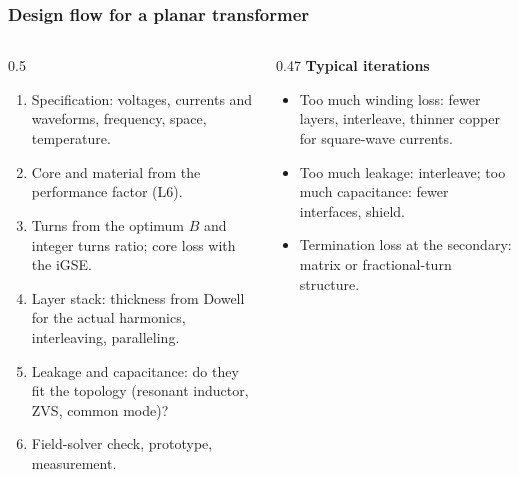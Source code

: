 \begin{frame}
	\frametitle{Design flow for a planar transformer}
	\begin{columns}[T]
		\begin{column}{0.5\textwidth}
			\small
			\begin{enumerate}
				\item Specification: voltages, currents and waveforms, frequency, space, temperature.
				\item Core and material from the performance factor (L6).
				\item Turns from the optimum $\hat{B}$ and integer turns ratio; core loss with the iGSE.
				\item Layer stack: thickness from Dowell for the actual harmonics, interleaving, paralleling.
				\item Leakage and capacitance: do they fit the topology (resonant inductor, ZVS, common mode)?
				\item Field-solver check, prototype, measurement.
			\end{enumerate}
		\end{column}
		\begin{column}{0.47\textwidth}
			\small
			\textbf{Typical iterations}
			\begin{itemize}
				\item Too much winding loss: fewer layers, interleave, thinner copper for square-wave currents.
				\item Too much leakage: interleave; too much capacitance: fewer interfaces, shield.
				\item Termination loss at the secondary: matrix or fractional-turn structure.
			\end{itemize}
		\end{column}
	\end{columns}
\end{frame}

